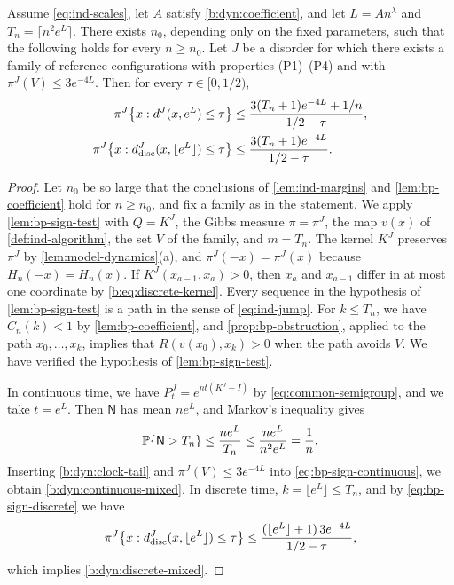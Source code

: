 \begin{proposition}\label{prop:bp-quenched}
Assume \eqref{eq:ind-scales}, let $A$ satisfy \eqref{b:dyn:coefficient}, and let $L=An^\lambda$ and $T_n=\lceil n^2e^L\rceil$. There exists $n_0$, depending only on the fixed parameters, such that the following holds for every $n\ge n_0$. Let $J$ be a disorder for which there exists a family of reference configurations with properties (P1)--(P4) and with $\pi^J(V)\le3e^{-4L}$. Then for every $\tau\in[0,1/2)$,
\begin{align}
 \pi^J\bigl\{x:d^J(x,e^{L})\le\tau\bigr\}
 &\le\frac{3(T_n+1)e^{-4L}+1/n}{1/2-\tau},\label{b:dyn:continuous-mixed}\\
 \pi^J\bigl\{x:d^J_{\rm disc}(x,\lfloor e^{L}\rfloor)\le\tau\bigr\}
 &\le\frac{3(T_n+1)e^{-4L}}{1/2-\tau}.\label{b:dyn:discrete-mixed}
\end{align}
\end{proposition}

\begin{proof}
Let $n_0$ be so large that the conclusions of \cref{lem:ind-margins} and \cref{lem:bp-coefficient} hold for $n\ge n_0$, and fix a family as in the statement. We apply \cref{lem:bp-sign-test} with $Q=K^J$, the Gibbs measure $\pi=\pi^J$, the map $v(x)$ of \cref{def:ind-algorithm}, the set $V$ of the family, and $m=T_n$. The kernel $K^J$ preserves $\pi^J$ by \cref{lem:model-dynamics}(a), and $\pi^J(-x)=\pi^J(x)$ because $H_n(-x)=H_n(x)$. If $K^J(x_{a-1},x_a)>0$, then $x_a$ and $x_{a-1}$ differ in at most one coordinate by \eqref{b:eq:discrete-kernel}. Every sequence in the hypothesis of \cref{lem:bp-sign-test} is a path in the sense of \eqref{eq:ind-jump}. For $k\le T_n$, we have $C_n(k)<1$ by \cref{lem:bp-coefficient}, and \cref{prop:bp-obstruction}, applied to the path $x_0,\dots,x_k$, implies that $R(v(x_0),x_k)>0$ when the path avoids $V$. We have verified the hypothesis of \cref{lem:bp-sign-test}.

In continuous time, we have $P^J_t=e^{nt(K^J-I)}$ by \eqref{eq:common-semigroup}, and we take $t=e^L$. Then $\mathsf N$ has mean $ne^L$, and Markov's inequality gives
\begin{equation}\label{b:dyn:clock-tail}
 \mathbb P\{\mathsf N>T_n\}\le\frac{ne^L}{T_n}\le\frac{ne^L}{n^2e^L}=\frac1n.
\end{equation}
Inserting \eqref{b:dyn:clock-tail} and $\pi^J(V)\le3e^{-4L}$ into \eqref{eq:bp-sign-continuous}, we obtain \eqref{b:dyn:continuous-mixed}. In discrete time, $k=\lfloor e^L\rfloor\le T_n$, and by \eqref{eq:bp-sign-discrete} we have
\[
 \pi^J\bigl\{x:d^J_{\rm disc}(x,\lfloor e^L\rfloor)\le\tau\bigr\}\le\frac{(\lfloor e^L\rfloor+1)\,3e^{-4L}}{1/2-\tau},
\]
which implies \eqref{b:dyn:discrete-mixed}.
\end{proof}

